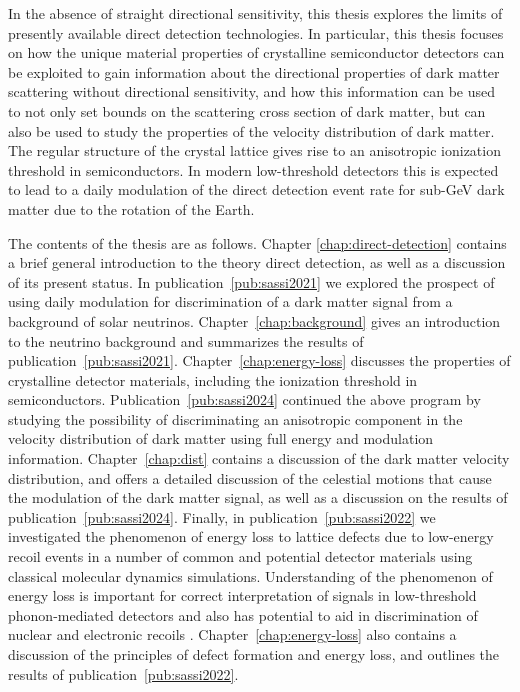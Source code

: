 In the absence of straight directional sensitivity, this thesis explores the limits of presently available direct detection technologies. In particular, this thesis focuses on how the unique material properties of crystalline semiconductor detectors can be exploited to gain information about the directional properties of dark matter scattering without directional sensitivity, and how this information can be used to not only set bounds on the scattering cross section of dark matter, but can also be used to study the properties of the velocity distribution of dark matter. The regular structure of the crystal lattice gives rise to an anisotropic ionization threshold in semiconductors. In modern low-threshold detectors this is expected to lead to a daily modulation of the direct detection event rate for sub-GeV dark matter due to the rotation of the Earth. 

The contents of the thesis are as follows. Chapter \ref{chap:direct-detection} contains a brief general introduction to the theory direct detection, as well as a discussion of its present status. In publication~\ref{pub:sassi2021} we explored the prospect of using daily modulation for discrimination of a dark matter signal from a background of solar neutrinos. Chapter~\ref{chap:background} gives an introduction to the neutrino background and summarizes the results of publication~\ref{pub:sassi2021}. Chapter~\ref{chap:energy-loss} discusses the properties of crystalline detector materials, including the ionization threshold in semiconductors. Publication~\ref{pub:sassi2024} continued the above program by studying the possibility of discriminating an anisotropic component in the velocity distribution of dark matter using full energy and modulation information. Chapter~\ref{chap:dist} contains a discussion of the dark matter velocity distribution, and offers a detailed discussion of the celestial motions that cause the modulation of the dark matter signal, as well as a discussion on the results of publication~\ref{pub:sassi2024}. Finally, in publication~\ref{pub:sassi2022} we investigated the phenomenon of energy loss to lattice defects due to low-energy recoil events in a number of common and potential detector materials using classical molecular dynamics simulations. Understanding of the phenomenon of energy loss is important for correct interpretation of signals in low-threshold phonon-mediated detectors and also has potential to aid in discrimination of nuclear and electronic recoils \parencite{HeikinheimoEtAl2022}. Chapter~\ref{chap:energy-loss} also contains a discussion of the principles of defect formation and energy loss, and outlines the results of publication~\ref{pub:sassi2022}.

